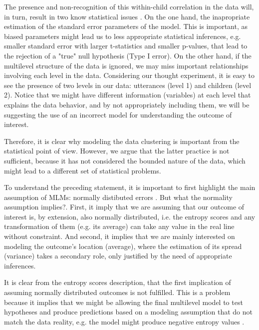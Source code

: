 The presence and non-recognition of this within-child correlation in the data will, in turn, result in two know statistical issues \citep{Finch_et_al_2019}. On the one hand, the inapropriate estimation of the standard error parameters of the model. This is important, as biased parameters might lead us to less appropriate statistical inferences, e.g. smaller standard error with larger t-statistics and smaller p-values, that lead to the rejection of a "true" null hypothesis (Type I error). On the other hand, if the multilevel structure of the data is ignored, we may miss important relationships involving each level in the data. Considering our thought experiment, it is easy to see the presence of two levels in our data: utterances (level 1) and children (level 2). Notice that we might have different information (variables) at each level that explains the data behavior, and by not appropriately including them, we will be suggesting the use of an incorrect model for understanding the outcome of interest.

Therefore, it is clear why modeling the data clustering is important from the statistical point of view. However, we argue that the latter practice is not sufficient, because it has not considered the bounded nature of the data, which might lead to a different set of statistical problems.

To understand the preceding statement, it is important to first highlight the main assumption of MLMs: normally distibuted errors \citep{Nelder_et_al_1983}. But what the normality assumption implies?. First, it imply that we are assuming that our outcome of interest is, by extension, also normally distributed, i.e. the entropy scores and any transformation of them (e.g. its average) can take any value in the real line without constraint. And second, it implies that we are mainly interested on modeling the outcome's location (average), where the estimation of its spread (variance) takes a secondary role, only justified by the need of appropriate inferences.

It is clear from the entropy scores description, that the first implication of assuming normally distributed outcomes is not fulfilled. This is a problem because it implies that we might be allowing the final multilevel model to test hypotheses and produce predictions based on a modeling assumption that do not match the data reality, e.g. the model might produce negative entropy values \citep{McElreath_2020}.

